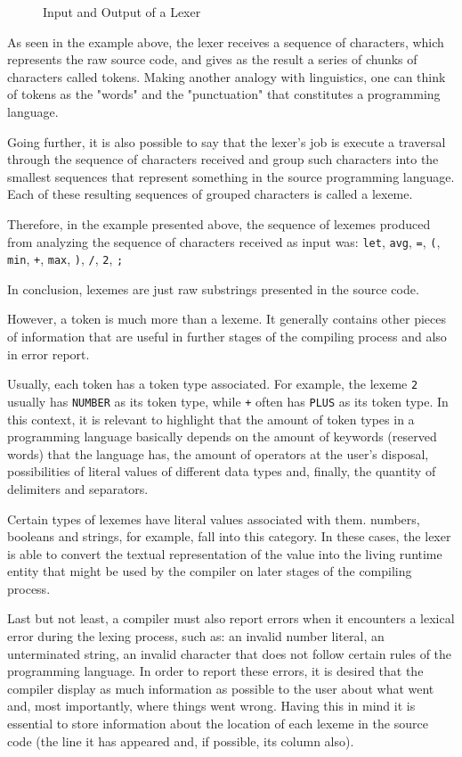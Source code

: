 \begin{figure}[H]  
  \caption{Input and Output of a Lexer}
  \label{fig:lexer}
\end{figure}

As seen in the example above, the lexer receives a sequence of characters, which represents the raw source code, and gives as the result a series of chunks of characters called tokens. Making another analogy with linguistics, one can think of tokens as the "words" and  the "punctuation" that constitutes a programming language.

Going further, it is also possible to say that the lexer's job is execute a traversal through the sequence of characters received and group such characters into the smallest sequences that represent something in the source programming language. Each of these resulting sequences of grouped characters is called a lexeme.

Therefore, in the example presented above, the sequence of lexemes produced from analyzing the sequence of characters received as input was: \texttt{let}, \texttt{avg}, \texttt{=}, \texttt{(}, \texttt{min}, \texttt{+}, \texttt{max}, \texttt{)}, \texttt{/}, \texttt{2}, \texttt{;}

In conclusion, lexemes are just raw substrings presented in the source code.

However, a token is much more than a lexeme. It generally contains other pieces of information that are useful in further stages of the compiling process and also in error report.

Usually, each token has a token type associated. For example, the lexeme \texttt{2} usually has \texttt{NUMBER} as its token type, while \texttt{+} often has \texttt{PLUS} as its token type. In this context, it is relevant to highlight that the amount of token types in a programming language basically depends on the amount of keywords (reserved words) that the language has, the amount of operators at the user's disposal, possibilities of literal values of different data types and, finally, the quantity of delimiters and separators.

Certain types of lexemes have literal values associated with them. numbers, booleans and strings, for example, fall into this category. In these cases, the lexer is able to convert the textual representation of the value into the living runtime entity that might be used by the compiler on later stages of the compiling process.

Last but not least, a compiler must also report errors when it encounters a lexical error during the lexing process, such as: an invalid number literal, an unterminated string, an invalid character that does not follow certain rules of the programming language. In order to report these errors, it is desired that the compiler display as much information as possible to the user about what went and, most importantly, where things went wrong. Having this in mind it is essential to store information about the location of each lexeme in the source code (the line it has appeared and, if possible, its column also).

